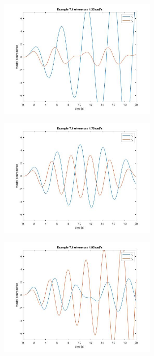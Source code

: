 \documentclass{article}
\begin{document}
\begin{enumerate}
        \begin{figure}[H]
        \vspace{-10pt}
        \includegraphics[width=0.7\textwidth,left]{MCHE 6390/HW03/Figures/Figure 3 - 1.35rad.jpg}
        \label{fig:Modal_Response_4_1.35}
        \end{figure}
        
        \begin{figure}[H]
        \vspace{-10pt}
        \includegraphics[width=0.7\textwidth,left]{MCHE 6390/HW03/Figures/Figure 3 - 1.70rad.jpg}
        \label{fig:Modal_Response_4_1.70}
        \end{figure}
        
        \begin{figure}[H]
        \vspace{-10pt}
        \includegraphics[width=0.7\textwidth,left]{MCHE 6390/HW03/Figures/Figure 3 - 1.95rad.jpg}
        \label{fig:Modal_Response_4_1.95}
        \end{figure}
        

\end{enumerate}
\end{document}
